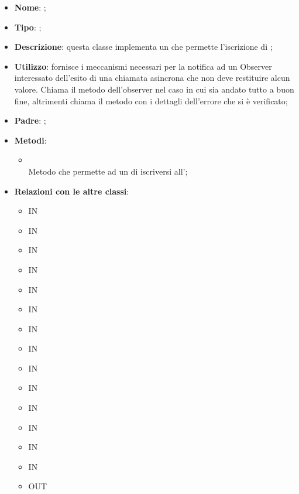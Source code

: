\begin{itemize}
	\item \textbf{Nome}: ;
	\item \textbf{Tipo}: ;
	\item \textbf{Descrizione}: questa classe implementa un  che permette l'iscrizione di ;
	\item \textbf{Utilizzo}: fornisce i meccanismi necessari per la notifica ad un Observer interessato dell'esito di una chiamata asincrona che non deve restituire alcun valore. Chiama il metodo  dell'observer nel caso in cui sia andato tutto a buon fine, altrimenti chiama il metodo  con i dettagli dell'errore che si è verificato;
	\item \textbf{Padre}: ;
	\item \textbf{Metodi}:
	\begin{itemize}
		\item[]  \\
		Metodo che permette ad un  di iscriversi all';\\
	\end{itemize}
	\item \textbf{Relazioni con le altre classi}:
	\begin{itemize}
		\item IN \hyperlink{<<interface>> ConversationsDAO_label}{}
		\item IN \hyperlink{ConversationsDAODynamoDB_label}{}
		\item IN \hyperlink{<<interface>> GuestsDAO_label}{}
		\item IN \hyperlink{GuestsDAODynamoDB_label}{}
		\item IN \hyperlink{<<interface>> MembersDAO_label}{}
		\item IN \hyperlink{MembersDAOSlack_label}{}
		\item IN \hyperlink{<<interface>> RulesDAO_label}{}
		\item IN \hyperlink{<<interface>> TasksDAO_label}{}
		\item IN \hyperlink{RulesDAODynamoDB_label}{}
		\item IN \hyperlink{TasksDAODynamoDB_label}{}
		\item IN \hyperlink{<<interface>> UsersDAO_label}{}
		\item IN \hyperlink{UsersDAODynamoDB_label}{}
		\item IN \hyperlink{<<interface>> AgentsDAO_label}{}
		\item IN \hyperlink{AgentsDAODynamoDB_label}{}
		\item OUT \hyperlink{ErrorObserver_label}{}
	\end{itemize}
\end{itemize}
\FloatBarrier

